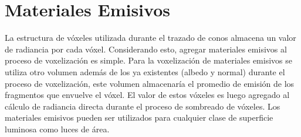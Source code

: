\section{Materiales Emisivos} %
\label{sec:materiales_emisivos}
La estructura de vóxeles utilizada durante el trazado de conos almacena un valor de radiancia por cada vóxel. Considerando esto, agregar materiales emisivos al proceso de voxelización es simple. Para la voxelización de materiales emisivos se utiliza otro volumen además de los ya existentes (albedo y normal) durante el proceso de voxelización, este volumen almacenaría el promedio de emisión de los fragmentos que envuelve el vóxel. El valor de estos vóxeles es luego agregado al cálculo de radiancia directa durante el proceso de sombreado de vóxeles. Los materiales emisivos pueden ser utilizados para cualquier clase de superficie luminosa como luces de área.
